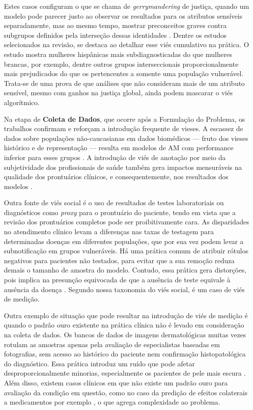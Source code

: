 Estes casos configuram o que se chama de \textit{gerrymandering} de justiça, quando um modelo pode parecer justo ao observar os resultados para os atributos sensíveis separadamente, mas ao mesmo tempo, mostrar preconceitos graves contra subgrupos definidos pela interseção dessas identidades \cite{kearns2018preventing}. Dentre os estudos selecionados na revisão, \citet{seyyed2021underdiagnosis} se destaca ao detalhar esse viés cumulativo na prática. O estudo mostra mulheres hispânicas mais subdiagnosticadas do que mulheres brancas, por exemplo, dentre outros grupos interseccionais proporcionalmente mais prejudicados do que os pertencentes a somente uma população vulnerável. Trata-se de uma prova de que análises que não consideram mais de um atributo sensível, mesmo com ganhos na justiça global, ainda podem mascarar o viés algorítmico.

Na etapa de \textbf{Coleta de Dados}, que ocorre após a Formulação do Problema, os trabalhos confirmam e reforçam a introdução frequente de vieses. A escassez de dados sobre populações não-caucasianas em dados biomédicos — fruto dos vieses histórico e de representação — resulta em modelos de AM com performance inferior para esses grupos \cite{afrose2022subpopulation,burlina2021addressing,gao2020deep,roosli2022peeking}. A introdução de viés de anotação por meio da subjetividade dos profissionais de saúde também gera impactos mensuráveis na qualidade dos prontuários clínicos, e consequentemente, nos resultados dos modelos \cite{afshar2022development}.

Outra fonte de viés social é o uso de resultados de testes laboratoriais ou diagnósticos como \textit{proxy} para o prontuário do paciente, tendo em vista que a revisão dos prontuários completos pode ser proibitivamente cara. As disparidades no atendimento clínico levam a diferenças nas taxas de testagem para determinadas doenças em diferentes populações, que por sua vez podem levar a subnotificação em grupos vulneráveis. Há uma prática comum de atribuir rótulos negativos para pacientes não testados, para evitar que a sua remoção reduza demais o tamanho de amostra do modelo. Contudo, essa prática gera distorções, pois implica na presunção equivocada de que a ausência de teste equivale à ausência da doença \cite{chang2208disparate}. Segundo nossa taxonomia do viés social, é um caso de viés de medição.

Outra exemplo de situação que pode resultar na introdução de viés de medição é quando o padrão ouro existente na prática clínica não é levado em consideração na coleta de dados. Os bancos de dados de imagens dermatológicas muitas vezes rotulam as amostras apenas pela avaliação de especialistas baseadas em fotografias, sem acesso ao histórico do paciente nem confirmação histopatológica do diagnóstico. Essa prática introduz um ruído que pode afetar desproporcionalmente minorias, especialmente os pacientes de pele mais escura \cite{daneshjou2022disparities}. Além disso, existem casos clínicos em que não existe um padrão ouro para avaliação da condição em questão, como no caso da predição de efeitos colaterais a medicamentos por exemplo \cite{chandak2020using}, o que agrega complexidade ao problema.

